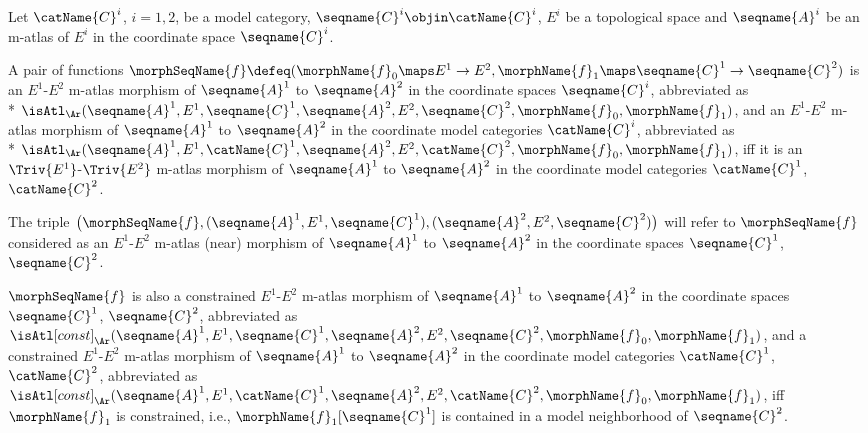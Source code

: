 \documentclass{article}
\begin{document}
\begin{definition}
\label{def:M-ATLmorphtop}
Let $\catName{C}^i$, $i=1,2$, be a model category,
$\seqname{C}^i \objin \catName{C}^i$, $E^i$ be a topological space and
$\seqname{A}^i$ be an m-atlas of $E^i$ in the coordinate space
$\seqname{C}^i$.

A pair of functions
$
  \morphSeqName{f} \defeq
  (
    \morphName{f}_0 \maps E^1 \to E^2,
    \morphName{f}_1 \maps \seqname{C}^1 \to \seqname{C}^2
  )
$
is an $E^1$-$E^2$ m-atlas morphism of
$\seqname{A}^1$ to $\seqname{A}^2$ in the coordinate spaces
$\seqname{C}^i$, abbreviated as \\*
$
  \isAtl_\Ar
    (
      \seqname{A}^1,
      E^1,
      \seqname{C}^1,
      \seqname{A}^2,
      E^2,
      \seqname{C}^2,
      \morphName{f}_0,
      \morphName{f}_1
    )
$,
and an $E^1$-$E^2$ m-atlas morphism of $\seqname{A}^1$ to $\seqname{A}^2$
in the coordinate model categories $\catName{C}^i$, abbreviated as \\*
$
  \isAtl_\Ar
    (
      \seqname{A}^1,
      E^1,
      \catName{C}^1,
      \seqname{A}^2,
      E^2,
      \catName{C}^2,
      \morphName{f}_0,
      \morphName{f}_1
    )
$,
iff it is an $\Triv{E^1}$-$\Triv{E^2}$ m-atlas morphism of
$\seqname{A}^1$ to $\seqname{A}^2$ in the coordinate model categories
$\catName{C}^1$, $\catName{C}^2$.

The triple
$
  \bigl (
    \morphSeqName{f},
    (\seqname{A}^1, E^1, \seqname{C}^1),
    (\seqname{A}^2, E^2, \seqname{C}^2)
  \bigr )
$
will refer to $\morphSeqName{f}$ considered as an $E^1$-$E^2$ m-atlas
(near) morphism of $\seqname{A}^1$ to $\seqname{A}^2$ in the coordinate
spaces $\seqname{C}^1$, $\seqname{C}^2$.

$\morphSeqName{f}$ is also a constrained $E^1$-$E^2$ m-atlas morphism of
$\seqname{A}^1$ to $\seqname{A}^2$ in the coordinate spaces
$\seqname{C}^1$, $\seqname{C}^2$, abbreviated as
$
  \isAtl[const]_\Ar
    (
      \seqname{A}^1,
      E^1,
      \seqname{C}^1,
      \seqname{A}^2,
      E^2,
      \seqname{C}^2,
      \morphName{f}_0,
      \morphName{f}_1
    )
$,
and a constrained $E^1$-$E^2$ m-atlas morphism of $\seqname{A}^1$ to $\seqname{A}^2$
in the coordinate model categories $\catName{C}^1$, $\catName{C}^2$, abbreviated as
$
  \isAtl[const]_\Ar
    (
      \seqname{A}^1,
      E^1,
      \catName{C}^1,
      \seqname{A}^2,
      E^2,
      \catName{C}^2,
      \morphName{f}_0,
      \morphName{f}_1
    )
$,
iff $\morphName{f}_1$ is constrained, i.e.,
$\morphName{f}_1[\seqname{C}^1]$ is contained in a model neighborhood of
$\seqname{C}^2$.
\end{definition}
\end{document}
